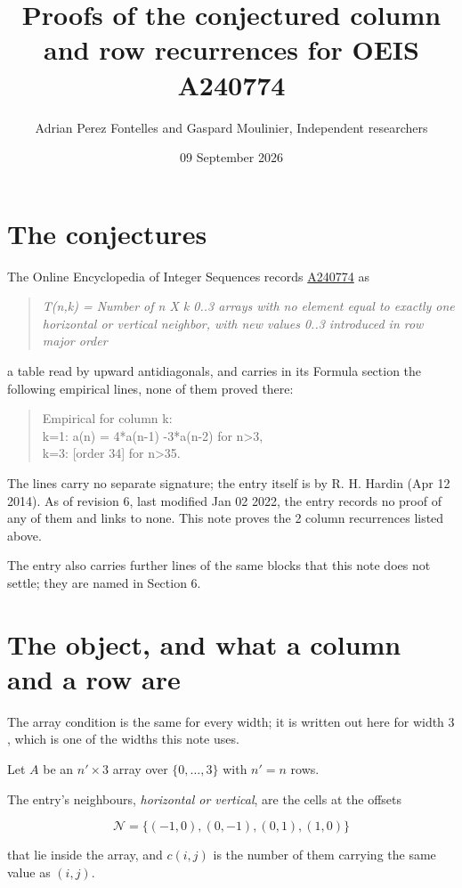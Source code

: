 \documentclass[11pt]{article}
\title{Proofs of the conjectured column and row recurrences for OEIS A240774}
\author{Adrian Perez Fontelles and Gaspard Moulinier, Independent researchers}
\date{09 September 2026}
\theoremstyle{definition}
\begin{document}
\maketitle
\section{The conjectures}

The Online Encyclopedia of Integer Sequences records \href{https://oeis.org/A240774}{A240774} as

\begin{quote}\itshape T(n,k) = Number of n X k 0..3 arrays with no element equal to exactly one horizontal or vertical neighbor, with new values 0..3 introduced in row major order\end{quote}

a table read by upward antidiagonals, and carries in its Formula section the following empirical lines, none of them proved there:

\begin{quote}\ttfamily Empirical for column k:\\
k=1: a(n) = 4*a(n-1) -3*a(n-2) for n>3,\\k=3: [order 34] for n>35.\end{quote}

The lines carry no separate signature; the entry itself is by R. H. Hardin (Apr 12 2014). As of revision 6, last modified Jan 02 2022, the entry records no proof of any of them and links to none. This note proves the 2 column recurrences listed above.

The entry also carries further lines of the same blocks that this note does not settle; they are named in Section 6.

\section{The object, and what a column and a row are}

The array condition is the same for every width; it is written out here for width $3$, which is one of the widths this note uses.

Let $A$ be an $n' \times 3$ array over $\{0,\dots,3\}$ with $n' = n$ rows.

The entry's neighbours, {\itshape horizontal or vertical}, are the cells at the offsets

\[\mathcal{N} = \{(-1,0), (0,-1), (0,1), (1,0)\}\]

that lie inside the array, and $c(i,j)$ is the number of them carrying the same value as $(i,j)$.
\end{document}

